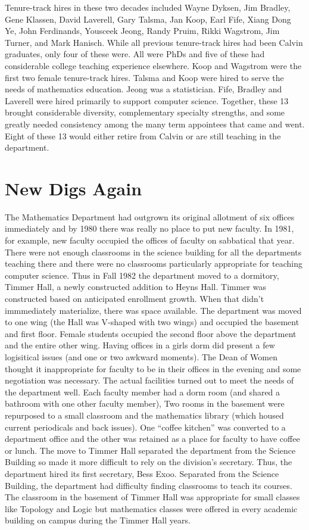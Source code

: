 \documentclass[
]{book}
\begin{document}
Tenure-track hires in these two decades included Wayne Dyksen, Jim Bradley, Gene Klassen, David Laverell, Gary Talsma, Jan Koop, Earl Fife, Xiang Dong Ye, John Ferdinands, Yousceek Jeong, Randy Pruim, Rikki Wagstrom, Jim Turner, and Mark Hanisch. While all previous tenure-track hires had been Calvin graduates, only four of these were. All were PhDs and five of these had considerable college teaching experience elsewhere. Koop and Wagstrom were the first two female tenure-track hires. Talsma and Koop were hired to serve the needs of mathematics education. Jeong was a statistician. Fife, Bradley and Laverell were hired primarily to support computer science. Together, these 13 brought considerable diversity, complementary specialty strengths, and some greatly needed consistency among the many term appointees that came and went.
Eight of these 13 would either retire from Calvin or are still teaching in the department.

\hypertarget{new-digs-again}{%
\section{New Digs Again}\label{new-digs-again}}

The Mathematics Department had outgrown its original allotment of six offices immediately and by 1980 there was really no place to put new faculty. In 1981, for example, new faculty occupied the offices of faculty on sabbatical that year. There were not enough classrooms in the science building for all the departments teaching there and there were no classrooms particularly appropriate for teaching computer science. Thus in Fall 1982 the department moved to a dormitory, Timmer Hall, a newly constructed addition to Heyns Hall. Timmer was constructed based on anticipated enrollment growth. When that didn't immmediately materialize, there was space available. The department was moved to one wing (the Hall was V-shaped with two wings) and occupied the basement and first floor. Female students occupied the second floor above the department and the entire other wing. Having offices in a girls dorm did present a few logisitical issues (and one or two awkward moments). The Dean of Women thought it inappropriate for faculty to be in their offices in the evening and some negotiation was necessary. The actual facilities turned out to meet the needs of the department well. Each faculty member had a dorm room (and shared a bathroom with one other faculty member), Two rooms in the basement were repurposed to a small classroom and the mathematics library (which housed current periodicals and back issues). One ``coffee kitchen'' was converted to a department office and the other was retained as a place for faculty to have coffee or lunch. The move to Timmer Hall separated the department from the Science Building so made it more difficult to rely on the division's secretary. Thus, the department hired its first secretary, Bess Exoo. Separated from the Science Building, the department had difficulty finding classrooms to teach its courses. The classroom in the basement of Timmer Hall was appropriate for small classes like Topology and Logic but mathematics classes were offered in every academic building on campus during the Timmer Hall years.
\end{document}
